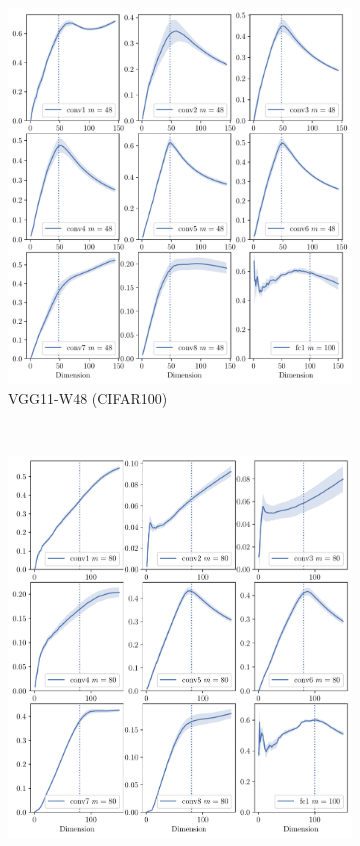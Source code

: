 \begin{figure}[H]
\begin{subfigure}[b]{0.48\textwidth}
        \includegraphics[width=\textwidth]{Appendix_Figures/Overlap_large_model/overlap_raw/DimOverlap_CIFAR100_VGG11W48New_nobn_fixlr0.01_appendix_vertical_3col.pdf}
        \caption{VGG11-W48 (CIFAR100)}
        \label{fig:app_adexp_cifar100_vgg48}
    \end{subfigure}%
    \ \ \ \ \ \
    \begin{subfigure}[b]{0.48\textwidth}
        \centering
        \captionsetup{justification=centering}
        \includegraphics[width=\textwidth]{Appendix_Figures/Overlap_large_model/overlap_raw/DimOverlap_CIFAR100_VGG11W80New_nobn_fixlr0.01_appendix_vertical_3col.pdf}

\end{subfigure}
\end{figure}
